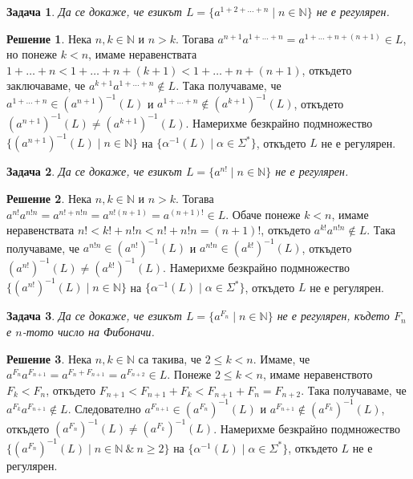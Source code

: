 \documentclass{article}
\newtheorem{problem}{Задача}[section]
\theoremstyle{definition}
\newtheorem*{solution}{Решение}
\begin{document}
\begin{problem}
Да се докаже, че езикът $L = \{ a^{1 + 2 + \dots + n} \mid n \in \mathbb{N} \}$ не е регулярен.
\end{problem}

\begin{solution}
    Нека $n, k \in \mathbb{N}$ и $n > k$.
    Тогава $a^{n+1}a^{1 + \dots + n} = a^{1 + \dots + n + (n + 1)} \in L$,
    но понеже $k < n$, имаме неравенствата $1 + \dots + n < 1 + \dots + n + (k + 1) < 1 + \dots + n + (n + 1)$, откъдето заключаваме, че $a^{k+1}a^{1 + \dots + n} \notin L$.
    Така получаваме, че $a^{1 + \dots + n} \in (a^{n + 1})^{-1}(L)$ и $a^{1 + \dots + n} \notin (a^{k + 1})^{-1}(L)$, откъдето $(a^{n + 1})^{-1}(L) \neq (a^{k + 1})^{-1}(L)$.
    Намерихме безкрайно подмножество $\{ (a^{n + 1})^{-1}(L) \mid n \in \mathbb{N} \}$ на $\{ \alpha^{-1}(L) \mid \alpha \in \Sigma^* \}$, откъдето $L$ не е регулярен.
\end{solution}

\begin{problem}
Да се докаже, че езикът $L = \{ a^{n!} \mid n \in \mathbb{N} \}$ не е регулярен.
\end{problem}

\begin{solution}
    Нека $n, k \in \mathbb{N}$ и $n > k$.
    Тогава $a^{n!}a^{n! n} = a^{n! + n! n} = a^{n!(n + 1)} = a^{(n+1)!} \in L$.
    Обаче понеже $k < n$, имаме неравенствата $n! < k! + n! n < n! + n! n = (n + 1)!$, откъдето $a^{k!}a^{n! n} \notin L$.
    Така получаваме, че $a^{n! n} \in (a^{n!})^{-1}(L)$ и $a^{n! n} \in (a^{k!})^{-1}(L)$, откъдето $(a^{n!})^{-1}(L) \neq (a^{k!})^{-1}(L)$.
    Намерихме безкрайно подмножество $\{ (a^{n!})^{-1}(L) \mid n \in \mathbb{N} \}$ на $\{ \alpha^{-1}(L) \mid \alpha \in \Sigma^* \}$, откъдето $L$ не е регулярен.
\end{solution}

\begin{problem}
Да се докаже, че езикът $L = \{ a^{F_n} \mid n \in \mathbb{N} \}$ не е регулярен, където $F_n$ е $n$-тото число на Фибоначи.
\end{problem}

\begin{solution}
    Нека $n, k \in \mathbb{N}$ са такива, че $2 \leq k < n$. Имаме, че $a^{F_n} a^{F_{n+1}} = a^{F_n + F_{n+1}} = a^{F_{n+2}} \in L$.
    Понеже $2 \leq k < n$, имаме неравенството $F_k < F_n$, откъдето $F_{n+1} < F_{n+1} + F_k < F_{n+1} + F_n = F_{n+2}$.
    Така получаваме, че $a^{F_k} a^{F_{n+1}} \notin L$.
    Следователно $a^{F_{n+1}} \in (a^{F_n})^{-1}(L)$ и $a^{F_{n+1}} \notin (a^{F_k})^{-1}(L)$, откъдето $(a^{F_n})^{-1}(L) \neq (a^{F_k})^{-1}(L)$.
    Намерихме безкрайно подмножество $\{ (a^{F_n})^{-1}(L) \mid n \in \mathbb{N} \: \& \: n \geq 2 \}$ на $\{ \alpha^{-1}(L) \mid \alpha \in \Sigma^* \}$, откъдето $L$ не е регулярен.
\end{solution}
\end{document}

